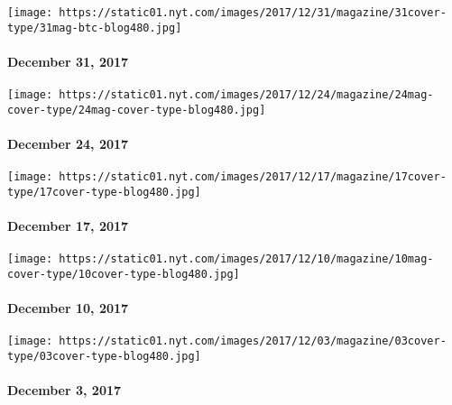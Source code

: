 \texttt{[image: https://static01.nyt.com/images/2017/12/31/magazine/31cover-type/31mag-btc-blog480.jpg]}

\hypertarget{december-31-2017}{%
\paragraph{December 31, 2017}\label{december-31-2017}}

\href{https://www.nytimes.com/issue/magazine/2017/12/26/122417-issue}{}

\texttt{[image: https://static01.nyt.com/images/2017/12/24/magazine/24mag-cover-type/24mag-cover-type-blog480.jpg]}

\hypertarget{december-24-2017}{%
\paragraph{December 24, 2017}\label{december-24-2017}}

\href{https://www.nytimes.com/interactive/2017/12/13/magazine/the-reckoning-women-and-power-in-the-workplace.html}{}

\texttt{[image: https://static01.nyt.com/images/2017/12/17/magazine/17cover-type/17cover-type-blog480.jpg]}

\hypertarget{december-17-2017}{%
\paragraph{December 17, 2017}\label{december-17-2017}}

\href{https://www.nytimes.com/interactive/2017/12/07/magazine/great-performers-horror-show.html}{}

\texttt{[image: https://static01.nyt.com/images/2017/12/10/magazine/10mag-cover-type/10cover-type-blog480.jpg]}

\hypertarget{december-10-2017}{%
\paragraph{December 10, 2017}\label{december-10-2017}}

\href{https://www.nytimes.com/issue/magazine/2017/12/01/120317-issue}{}

\texttt{[image: https://static01.nyt.com/images/2017/12/03/magazine/03cover-type/03cover-type-blog480.jpg]}

\hypertarget{december-3-2017}{%
\paragraph{December 3, 2017}\label{december-3-2017}}

